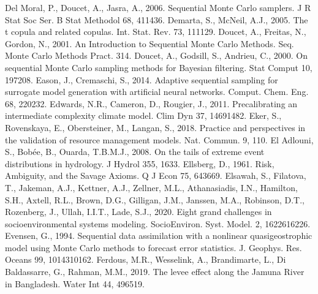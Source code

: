 \documentclass[letterpaper,10pt,english]{sphinxmanual}
\begin{document}
Del Moral, P., Doucet, A., Jasra, A., 2006. Sequential Monte Carlo samplers. J R Stat Soc Ser. B Stat Methodol 68, 411\textendash{}436. 
Demarta, S., McNeil, A.J., 2005. The t copula and related copulas. Int. Stat. Rev. 73, 111\textendash{}129.
Doucet, A., Freitas, N., Gordon, N., 2001. An Introduction to Sequential Monte Carlo Methods. Seq. Monte Carlo Methods Pract. 3\textendash{}14. 
Doucet, A., Godsill, S., Andrieu, C., 2000. On sequential Monte Carlo sampling methods for Bayesian filtering. Stat Comput 10, 197\textendash{}208. 
Eason, J., Cremaschi, S., 2014. Adaptive sequential sampling for surrogate model generation with artificial neural networks. Comput. Chem. Eng. 68, 220\textendash{}232. 
Edwards, N.R., Cameron, D., Rougier, J., 2011. Precalibrating an intermediate complexity climate model. Clim Dyn 37, 1469\textendash{}1482. 
Eker, S., Rovenskaya, E., Obersteiner, M., Langan, S., 2018. Practice and perspectives in the validation of resource management models. Nat. Commun. 9, 1\textendash{}10. 
El Adlouni, S., Bobée, B., Ouarda, T.B.M.J., 2008. On the tails of extreme event distributions in hydrology. J Hydrol 355, 16\textendash{}33. 
Ellsberg, D., 1961. Risk, Ambiguity, and the Savage Axioms. Q J Econ 75, 643\textendash{}669. 
Elsawah, S., Filatova, T., Jakeman, A.J., Kettner, A.J., Zellner, M.L., Athanasiadis, I.N., Hamilton, S.H., Axtell, R.L., Brown, D.G., Gilligan, J.M., Janssen, M.A., Robinson, D.T., Rozenberg, J., Ullah, I.I.T., Lade, S.J., 2020. Eight grand challenges in socio\sphinxhyphen{}environmental systems modeling. Socio\sphinxhyphen{}Environ. Syst. Model. 2, 16226\textendash{}16226. 
Evensen, G., 1994. Sequential data assimilation with a nonlinear quasi\sphinxhyphen{}geostrophic model using Monte Carlo methods to forecast error statistics. J. Geophys. Res. Oceans 99, 10143\textendash{}10162. 
Ferdous, M.R., Wesselink, A., Brandimarte, L., Di Baldassarre, G., Rahman, M.M., 2019. The levee effect along the Jamuna River in Bangladesh. Water Int 44, 496\textendash{}519. 
\end{document}
